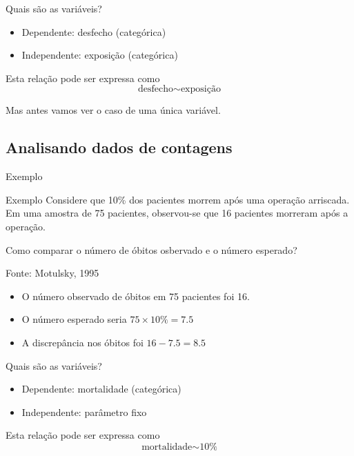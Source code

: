 \documentclass{beamer}
\begin{document}
\begin{frame}{\scriptsize Quais são as variáveis?}
  \begin{itemize}
    \small
  \item Dependente: desfecho (categórica)
  \item Independente: exposição (categórica)
  \end{itemize}
  \vfill
  \begin{block}{Esta relação pode ser expressa como}
    \begin{displaymath}
      \text{desfecho} \sim \text{exposição}
    \end{displaymath}
  \end{block}
\end{frame}

\begin{frame}{\scriptsize }
  \begin{center}
    Mas antes vamos ver o caso de uma única variável.
  \end{center}
\end{frame}

\subsection{Analisando dados de contagens}

\begin{frame}{\scriptsize Exemplo}
  \begin{exampleblock}{Exemplo}
    \footnotesize
    Considere que 10\% dos pacientes morrem após uma operação
    arriscada. Em uma amostra de 75 pacientes, observou-se que 16
    pacientes morreram após a operação.

    Como comparar o número de óbitos osbervado e o número esperado?

    Fonte: Motulsky, 1995
  \end{exampleblock}
  \begin{itemize}
  \item O número observado de óbitos em 75 pacientes foi 16.
  \item O número esperado seria $75 \times 10\% = 7.5$
  \item A discrepância nos óbitos foi $16-7.5 = 8.5$
  \end{itemize}
\end{frame}

\begin{frame}{\scriptsize Quais são as variáveis?}
  \begin{itemize}
    \small
  \item Dependente: mortalidade (categórica)
  \item Independente: parâmetro fixo
  \end{itemize}
  \vfill
  \begin{block}{Esta relação pode ser expressa como}
    \begin{displaymath}
      \text{mortalidade} \sim \text{10\%}
    \end{displaymath}
  \end{block}
\end{frame}
\end{document}
